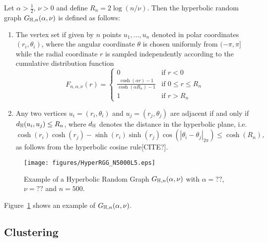 Let $\alpha > \frac{1}{2}$, $\nu > 0$ and define $R_n = 2\log(n/\nu)$. Then the hyperbolic random graph $G_{\mathbb{H},n}(\alpha, \nu)$ is defined as follows:
\begin{enumerate}
\item The vertex set if given by $n$ points $u_1, \dots, u_n$ denoted in polar coordinates $(r_i, \theta_i)$, where the angular coordinate $\theta$ is chosen uniformly from $(-\pi,\pi]$ while the radial coordinate $r$ is sampled independently according to the cumulative distribution function
\begin{equation}\label{eq:def_hyperbolic_point_distribution}
	F_{n,\alpha,\nu}(r) = \begin{cases}
		0 &\mbox{if } r < 0\\
		\frac{\cosh(\alpha r)-1}{\cosh(\alpha R_n) - 1} &\mbox{if } 0 \le r \le R_n\\
		1&\mbox{if } r > R_n
	\end{cases}
\end{equation}
\item Any two vertices $u_i=(r_i,\theta_i)$ and $u_j=(r_j,\theta_j)$ are adjacent if and only if $d_{\mathbb{H}}(u_i,u_j) \le R_n$, where $d_{\mathbb{H}}$ denotes the distance in the hyperbolic plane, i.e.
\[
	\cosh(r_i) \cosh(r_j) - \sinh(r_i) \sinh( r_j) \cos(|\theta_i-\theta_j|_{2\pi}) \le \cosh(R_n),
\]
as follows from the hyperbolic cosine rule[CITE?].
\end{enumerate}

\begin{figure}[!t]
\centering
\texttt{[image: figures/HyperRGG\_N5000L5.eps]}
\caption{Example of a Hyperbolic Random Graph $G_{\mathbb{H},n}(\alpha, \nu)$ with $\alpha = ??$, $\nu = ??$ and $n = 500$.}
\label{fig:H_graph_example}
\end{figure}

Figure~\ref{fig:H_graph_example} shows an example of $G_{\mathbb{H},n}(\alpha, \nu)$.






\subsection{Clustering}\label{ssec:local_clustering}

